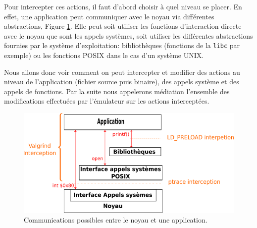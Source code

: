  
Pour intercepter ces actions, il faut d'abord choisir à quel niveau se placer.
En effet, une application peut communiquer avec le noyau via différentes
abstractions, Figure \ref{AS_Communication}. Elle peut soit utiliser les
fonctions d'interaction directe avec le noyau que sont les appels systèmes, soit
utiliser les différentes abstractions fournies par le système d'exploitation:
bibliothèques (fonctions de la \texttt{libc} par exemple) ou les fonctions POSIX dans le
cas d'un système UNIX.

Nous allons donc voir comment on peut intercepter et modifier des actions au
niveau de l'application (fichier source puis binaire), des appels système et
des appels de fonctions. Par la suite nous appelerons médiation l'ensemble des
modifications effectuées par l'émulateur sur les actions interceptées.

\begin{figure}[H]
 \centering
 \includegraphics[scale=0.75]{Pictures/png/Communication_application_noyau_v3.png}
 \caption{Communications possibles entre le noyau et une application.}
 \label{AS_Communication}
\end{figure}
